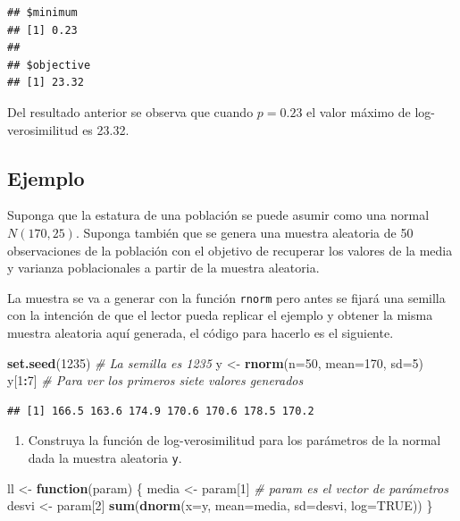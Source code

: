 \documentclass[10pt,]{krantz}
\makeatletter
\newenvironment{Shaded}{\begin{snugshade}}{\end{snugshade}}
\newcommand{\KeywordTok}[1]{\textcolor[rgb]{0.13,0.29,0.53}{\textbf{#1}}}
\newcommand{\DataTypeTok}[1]{\textcolor[rgb]{0.13,0.29,0.53}{#1}}
\newcommand{\DecValTok}[1]{\textcolor[rgb]{0.00,0.00,0.81}{#1}}
\newcommand{\StringTok}[1]{\textcolor[rgb]{0.31,0.60,0.02}{#1}}
\newcommand{\CommentTok}[1]{\textcolor[rgb]{0.56,0.35,0.01}{\textit{#1}}}
\newcommand{\OtherTok}[1]{\textcolor[rgb]{0.56,0.35,0.01}{#1}}
\newcommand{\ControlFlowTok}[1]{\textcolor[rgb]{0.13,0.29,0.53}{\textbf{#1}}}
\newcommand{\OperatorTok}[1]{\textcolor[rgb]{0.81,0.36,0.00}{\textbf{#1}}}
\newcommand{\NormalTok}[1]{#1}
\providecommand{\tightlist}{%
  \setlength{\itemsep}{0pt}\setlength{\parskip}{0pt}}
\newenvironment{kframe}{%
\medskip{}
\setlength{\fboxsep}{.8em}
 \def\at@end@of@kframe{}%
 \ifinner\ifhmode%
  \def\at@end@of@kframe{\end{minipage}}%
  \begin{minipage}{\columnwidth}%
 \fi\fi%
 \def\FrameCommand##1{\hskip\@totalleftmargin \hskip-\fboxsep
 \colorbox{shadecolor}{##1}\hskip-\fboxsep
     \hskip-\linewidth \hskip-\@totalleftmargin \hskip\columnwidth}%
 \MakeFramed {\advance\hsize-\width
   \@totalleftmargin\z@ \linewidth\hsize
   \@setminipage}}%
 {\par\unskip\endMakeFramed%
 \at@end@of@kframe}
\renewenvironment{Shaded}{\begin{kframe}}{\end{kframe}}
\makeatother
\begin{document}
\begin{verbatim}
## $minimum
## [1] 0.23
## 
## $objective
## [1] 23.32
\end{verbatim}

Del resultado anterior se observa que cuando \(p=0.23\) el valor máximo
de log-verosimilitud es 23.32.

\subsection*{Ejemplo}\label{ejemplo-50}


Suponga que la estatura de una población se puede asumir como una normal
\(N(170, 25)\). Suponga también que se genera una muestra aleatoria de
50 observaciones de la población con el objetivo de recuperar los
valores de la media y varianza poblacionales a partir de la muestra
aleatoria.

La muestra se va a generar con la función \texttt{rnorm} pero antes se
fijará una semilla con la intención de que el lector pueda replicar el
ejemplo y obtener la misma muestra aleatoria aquí generada, el código
para hacerlo es el siguiente.

\begin{Shaded}
\begin{Highlighting}[]
\KeywordTok{set.seed}\NormalTok{(}\DecValTok{1235}\NormalTok{)  }\CommentTok{# La semilla es 1235}
\NormalTok{y <-}\StringTok{ }\KeywordTok{rnorm}\NormalTok{(}\DataTypeTok{n=}\DecValTok{50}\NormalTok{, }\DataTypeTok{mean=}\DecValTok{170}\NormalTok{, }\DataTypeTok{sd=}\DecValTok{5}\NormalTok{)}
\NormalTok{y[}\DecValTok{1}\OperatorTok{:}\DecValTok{7}\NormalTok{]  }\CommentTok{# Para ver los primeros siete valores generados}
\end{Highlighting}
\end{Shaded}

\begin{verbatim}
## [1] 166.5 163.6 174.9 170.6 170.6 178.5 170.2
\end{verbatim}

\begin{enumerate}
\def\labelenumi{\arabic{enumi})}
\tightlist
\item
  Construya la función de log-verosimilitud para los parámetros de la
  normal dada la muestra aleatoria \texttt{y}.
\end{enumerate}

\begin{Shaded}
\begin{Highlighting}[]
\NormalTok{ll <-}\StringTok{ }\ControlFlowTok{function}\NormalTok{(param) \{}
\NormalTok{  media <-}\StringTok{ }\NormalTok{param[}\DecValTok{1}\NormalTok{]  }\CommentTok{# param es el vector de parámetros}
\NormalTok{  desvi <-}\StringTok{ }\NormalTok{param[}\DecValTok{2}\NormalTok{] }
  \KeywordTok{sum}\NormalTok{(}\KeywordTok{dnorm}\NormalTok{(}\DataTypeTok{x=}\NormalTok{y, }\DataTypeTok{mean=}\NormalTok{media, }\DataTypeTok{sd=}\NormalTok{desvi, }\DataTypeTok{log=}\OtherTok{TRUE}\NormalTok{))}
\NormalTok{\}}
\end{Highlighting}
\end{Shaded}
\end{document}
